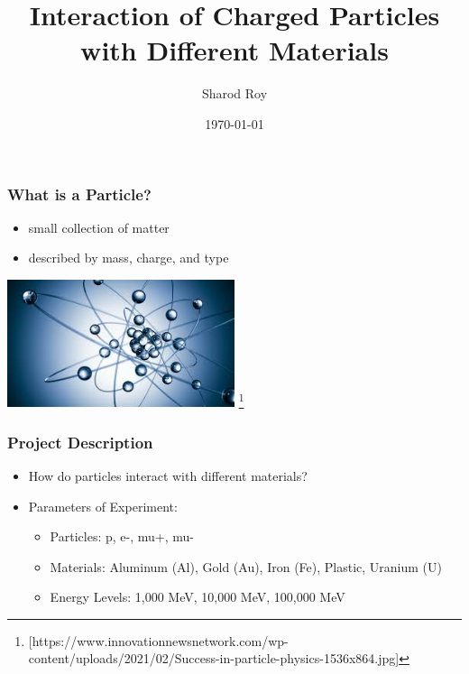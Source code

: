\documentclass[aspectratio-169]{beamer}
\title[]{Interaction of Charged Particles with Different Materials} %
\author{Sharod Roy} %
\institute[ICR] %
{
Institute for Computing in Research \\ %
\medskip
}
\date{\today} %
\begin{document}
\begin{frame}
\titlepage %
\end{frame}



\begin{frame}
\frametitle{What is a Particle?}
\begin{itemize}
\item small collection of matter
\item described by mass, charge, and type
\end{itemize}
\begin{center}
    \includegraphics[width=0.5\textwidth]{images.jpeg}
    \footnote{[https://www.innovationnewsnetwork.com/wp-content/uploads/2021/02/Success-in-particle-physics-1536x864.jpg]}
\end{center}
\end{frame}


\begin{frame}
\frametitle{Project Description}
\begin{itemize}
    \item How do particles interact with different materials?
    \item Parameters of Experiment:
    \begin{itemize}
        \item Particles: p, e-, mu+, mu- 
        \item Materials: Aluminum (Al), Gold (Au), Iron (Fe), Plastic, Uranium (U)
        \item Energy Levels: 1,000 MeV, 10,000 MeV, 100,000 MeV
    \end{itemize}

\end{itemize}
\end{frame}
\end{document}

